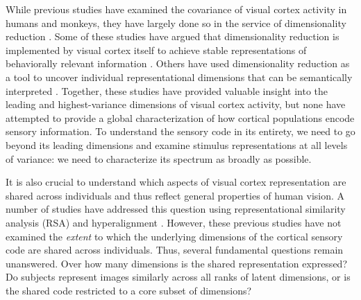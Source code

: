 \documentclass[10pt]{article}
\begin{document}
While previous studies have examined the covariance of visual cortex
activity in humans and monkeys, they have largely done so in the service
of dimensionality reduction
\autocite{Khosla2022,Tarhan2020,Haxby2011,Huth2012}. Some of these
studies have argued that dimensionality reduction is implemented by
visual cortex itself to achieve stable representations of behaviorally
relevant information \autocite{Lehky2014,Lehky2016,Fusi2016}. Others
have used dimensionality reduction as a tool to uncover individual
representational dimensions that can be semantically interpreted
\autocite{Thorat2019,Connolly2012,Huth2012,Khosla2022}. Together, these
studies have provided valuable insight into the leading and
highest-variance dimensions of visual cortex activity, but none have
attempted to provide a global characterization of how cortical
populations encode sensory information. To understand the sensory code
in its entirety, we need to go beyond its leading dimensions and examine
stimulus representations at all levels of variance: we need to
characterize its spectrum as broadly as possible.

It is also crucial to understand which aspects of visual cortex
representation are shared across individuals and thus reflect general
properties of human vision. A number of studies have addressed this
question using representational similarity analysis (RSA) and
hyperalignment \autocite{Kriegeskorte2008,Haxby2011,Haxby2020}. However,
these previous studies have not examined the \emph{extent} to which the
underlying dimensions of the cortical sensory code are shared across
individuals. Thus, several fundamental questions remain unanswered. Over
how many dimensions is the shared representation expressed? Do subjects
represent images similarly across all ranks of latent dimensions, or is
the shared code restricted to a core subset of dimensions?
\end{document}
